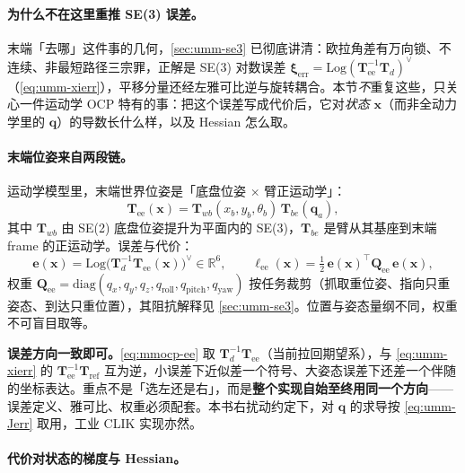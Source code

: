 \paragraph{为什么不在这里重推 SE(3) 误差。}
末端「去哪」这件事的几何，\cref{sec:umm-se3} 已彻底讲清：欧拉角差有万向锁、不连续、非最短路径三宗罪，正解是 SE(3) 对数误差 $\boldsymbol\xi_{\text{err}}=\mathrm{Log}(\mathbf T_{\text{ee}}^{-1}\mathbf T_d)^\vee$（\cref{eq:umm-xierr}），平移分量还经左雅可比逆与旋转耦合。本节\emph{不}重复这些，只关心一件运动学 OCP 特有的事：把这个误差写成代价后，它对\emph{状态} $\mathbf x$（而非全动力学里的 $\mathbf q$）的导数长什么样，以及 Hessian 怎么取。

\paragraph{末端位姿来自两段链。}
运动学模型里，末端世界位姿是「底盘位姿 $\times$ 臂正运动学」：
\begin{equation}
  \mathbf T_{\text{ee}}(\mathbf x)=\mathbf T_{wb}(x_b,y_b,\theta_b)\,\mathbf T_{be}(\mathbf q_a),
  \label{eq:mmocp-Twe}
\end{equation}
其中 $\mathbf T_{wb}$ 由 SE(2) 底盘位姿提升为平面内的 SE(3)，$\mathbf T_{be}$ 是臂从其基座到末端 frame 的正运动学。误差与代价：
\begin{equation}
  \mathbf e(\mathbf x)=\mathrm{Log}\big(\mathbf T_d^{-1}\mathbf T_{\text{ee}}(\mathbf x)\big)^\vee\in\mathbb R^6,
  \qquad
  \ell_{\text{ee}}(\mathbf x)=\tfrac12\,\mathbf e(\mathbf x)^\top\mathbf Q_{\text{ee}}\,\mathbf e(\mathbf x),
  \label{eq:mmocp-ee}
\end{equation}
权重 $\mathbf Q_{\text{ee}}=\mathrm{diag}(q_x,q_y,q_z,q_{\text{roll}},q_{\text{pitch}},q_{\text{yaw}})$ 按任务裁剪（抓取重位姿、指向只重姿态、到达只重位置），其阻抗解释见 \cref{sec:umm-se3}。位置与姿态量纲不同，权重不可盲目取等。

\begin{note}
\textbf{误差方向一致即可。}\;\cref{eq:mmocp-ee} 取 $\mathbf T_d^{-1}\mathbf T_{\text{ee}}$（当前拉回期望系），与 \cref{eq:umm-xierr} 的 $\mathbf T_{\text{ee}}^{-1}\mathbf T_{\text{ref}}$ 互为逆，小误差下近似差一个符号、大姿态误差下还差一个伴随的坐标表达。重点不是「选左还是右」，而是\textbf{整个实现自始至终用同一个方向}——误差定义、雅可比、权重必须配套。本书右扰动约定下，对 $\mathbf q$ 的求导按 \cref{eq:umm-Jerr} 取用，工业 CLIK 实现亦然。
\end{note}

\paragraph{代价对状态的梯度与 Hessian。}

